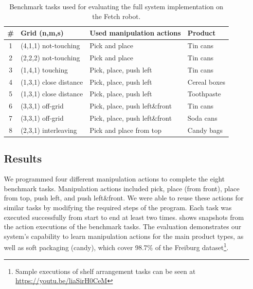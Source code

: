 \begin{table}[h]
	\centering
	\caption{Benchmark tasks used for evaluating the full system implementation on the Fetch robot.}
	\label{table:tasklist}
	\begin{center}
		\begin{tabular}{clll}
			\# & Grid (n,m,s) & Used manipulation actions & Product \\ \hline
			1 & (4,1,1) not-touching & Pick and place & Tin cans \\
			2 & (2,2,2) not-touching & Pick and place & Tin cans \\
			3 & (1,4,1) touching & Pick, place, push left & Tin cans \\
			4 & (1,3,1) close distance & Pick, place, push left & Cereal boxes \\
			5 & (1,3,1) close distance & Pick, place, push left & Toothpaste \\
			6 & (3,3,1) off-grid & Pick, place, push left\&front & Tin cans \\
			7 & (3,3,1) off-grid & Pick, place, push left\&front& Soda cans \\
			8 & (2,3,1) interleaving & Pick and place from top & Candy bags \\ \hline
		\end{tabular}
	\end{center}
\end{table}


\subsection{Results}
We programmed four different manipulation actions to complete the eight benchmark tasks. 
Manipulation actions included pick, place (from front), place from top, push left, and push left\&front.
We were able to reuse these actions for similar tasks by modifying the required steps of the program.
Each task was executed successfully from start to end at least two times.
 shows snapshots from the action executions of the benchmark tasks.
The evaluation demonstrates our system's capability to learn manipulation actions for the main product types, as well as soft packaging (\eg candy), which cover 98.7\% of the Freiburg dataset\footnote{Sample executions of shelf arrangement tasks can be seen at \url{https://youtu.be/liaSirH0CeM}}. 

